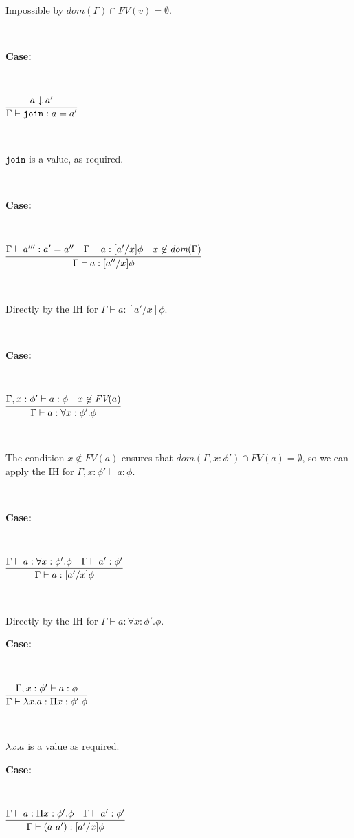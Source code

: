 \documentclass[copyright]{eptcs}
\newcommand{\join}[0]{\texttt{join}}
\begin{document}
\ 

\noindent Impossible by $dom(\Gamma) \cap FV(v) = \emptyset$.

\ 

\noindent \textbf{Case:}

\

$\infer{\Gamma\vdash \join : a = a'}{a \downarrow a'}$

\ 

\noindent $\join$ is a value, as required.

\ 

\noindent \textbf{Case:}

\

$\infer{\Gamma\vdash a:[a''/x]\phi}{\Gamma \vdash a''': a' = a'' & \Gamma \vdash a:[a'/x]\phi & x\not\in\textit{dom}(\Gamma)}$

\ 

\noindent Directly by the IH for $\Gamma \vdash a:[a'/x]\phi$.

\ 

\noindent \textbf{Case:}

\

$\infer{\Gamma \vdash a : \forall x:\phi'.\phi}{\Gamma, x:\phi' \vdash a:\phi & x\not\in\textit{FV}(a)}$

\ 

\noindent The condition $x\not\in\textit{FV}(a)$ ensures that $dom(\Gamma,x:\phi') \cap \textit{FV}(a) = \emptyset$, so we can apply the IH for $\Gamma, x:\phi' \vdash a:\phi$.

\ 

\noindent \textbf{Case:}

\

$\infer{\Gamma \vdash a : [a'/x]\phi}{\Gamma \vdash a:\forall x:\phi'.\phi & \Gamma \vdash a':\phi'}$

\ 

\noindent Directly by the IH for $\Gamma \vdash a:\forall x:\phi'.\phi$.

\noindent \textbf{Case:}

\

$\infer{\Gamma \vdash \lambda x.a : \Pi x:\phi'.\phi}
      {\Gamma, x:\phi' \vdash a:\phi}$

\ 

\noindent $\lambda x.a$ is a value as required.


\noindent \textbf{Case:}

\

$\infer{\Gamma \vdash (a\ a') : [a'/x]\phi}{\Gamma \vdash a:\Pi x:\phi'.\phi & \Gamma\vdash a':\phi'}$
\end{document}
